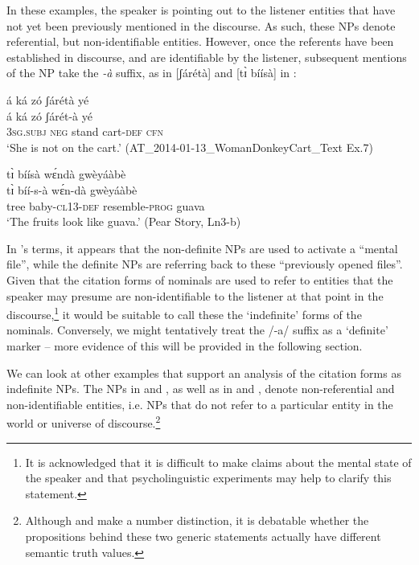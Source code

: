 \documentclass[output=paper]{langsci/langscibook}
\begin{document}

In these examples, the speaker is pointing out to the listener entities that have not yet been previously mentioned in the discourse. As such, these NPs denote referential, but non-identifiable entities. However, once the referents have been established in discourse, and are identifiable by the listener, subsequent mentions of the NP take the \textit{-à} suffix, as in [ʃárétà]  and [t\`ɪ bíísà] in :

\ea\label{ex:teo:30}
\glll á ká zó ʃárétà yé\\
 á ká zó ʃárét-à yé\\
 3\textsc{sg}\textsc{.subj} \textsc{neg} stand cart-\textsc{def}{\rmfnm}  \textsc{cfn}\\
\glt ‘She is not on the cart.’ (AT\_2014-01-13\_WomanDonkeyCart\_Text Ex.7)
\z
{}

\ea\label{ex:teo:31}
\glll t\`ɪ bíísà w\'ɛndà gwèyáàbè\\
 t\`ɪ bíí-s-à w\'ɛn-dà gwèyáàbè\\
 tree baby-\textsc{cl13-}\textsc{def} resemble-\textsc{prog} guava\\
\glt ‘The fruits look like guava.’ (Pear Story, Ln3-b)
\z

In \cite{DuBois1980}’s terms, it appears that the non-definite NPs are used to activate a “mental file”, while the definite NPs are referring back to these “previously opened files”. Given that the citation forms of nominals are used to refer to entities that the speaker may presume are non-identifiable to the listener at that point in the discourse,\footnote{It is acknowledged that it is difficult to make claims about the mental state of the speaker and that psycholinguistic experiments may help to clarify this statement.} it would be suitable to call these the ‘indefinite’ forms of the nominals. Conversely, we might tentatively treat the /-a/ suffix as a ‘definite’ marker – more evidence of this will be provided in the following section.

We can look at other examples that support an analysis of the citation forms as indefinite NPs. The NPs in  and , as well as in  and , denote non-referential and non-identifiable entities, i.e. NPs that do not refer to a particular entity in the world or universe of discourse.\footnote{Although  and  make a number distinction, it is debatable whether the propositions behind these two generic statements actually have different semantic truth values.}
\end{document}
